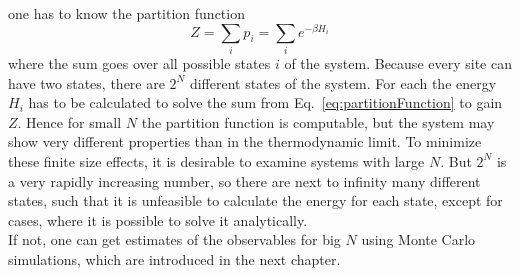     one has to know the partition function
    \begin{equation}
        Z = \sum_i p_i = \sum_i e^{-\beta H_i}
        \label{eq:partitionFunction}
    \end{equation}
    where the sum goes over all possible states \(i\) of the system.
    Because every site can have two states, there are \(2^N\) different
    states of the system. For each the energy \(H_i\) has to be calculated
    to solve the sum from Eq.\ \eqref{eq:partitionFunction} to gain \(Z\).
    Hence for small \(N\) the partition function is computable, but the system
    may show very different properties than in the thermodynamic limit.
    To minimize these finite size effects, it is desirable to examine
    systems with large \(N\). But \(2^N\) is a very rapidly increasing
    number, so there are next to infinity many different states, such
    that it is unfeasible to calculate the energy for each state, except
    for cases, where it is possible to solve it analytically.\\
    If not, one can get estimates of the observables for big \(N\) using
    Monte Carlo simulations, which are introduced in the next chapter.\\

